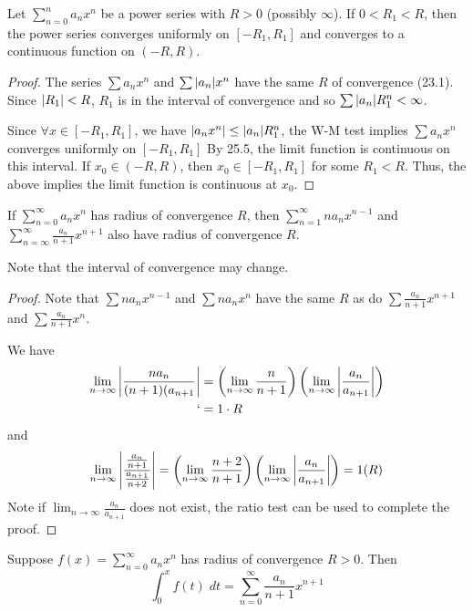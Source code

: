 \documentclass{article}
\begin{document}
    \begin{cthm}
      Let $\sum_{n=0}^n a_nx^n$ be a power series with $R > 0$ (possibly $\infty$). If $0 < R_1 < R$, then the power series converges uniformly on $[-R_1, R_1]$ and converges to a continuous function on $(-R, R)$.
    \end{cthm}
    \begin{proof}
      The series $\sum a_nx^n$ and $\sum \abs{a_n}x^n$ have the same $R$ of convergence (23.1). Since $\abs{R_1} < R$, $R_1$ is in the interval of convergence and so $\sum \abs{a_n}R_1^n < \infty$.

      Since $\forall x \in [-R_1, R_1]$, we have $\abs{a_nx^n} \leq \abs{a_n}R_1^n$, the W-M test implies $\sum a_nx^n$ converges uniformly on $[-R_1, R_1]$ By 25.5, the limit function is continuous on this interval. If $x_0 \in (-R, R)$, then $x_0 \in [-R_1, R_1]$ for some $R_1 < R$. Thus, the above implies the limit function is continuous at $x_0$.
    \end{proof}
    \begin{clemma}[Lemma 26.3]
      If $\sum_{n=0}^\infty a_nx^n$ has radius of convergence $R$, then $\sum_{n=1}^\infty na_nx^{n-1}$ and $\sum_{n=\infty}^\infty \frac{a_n}{n+1}x^{n+1}$ also have radius of convergence $R$.

      Note that the interval of convergence may change.
    \end{clemma}
    \begin{proof}
      Note that $\sum na_nx^{n-1}$ and $\sum na_nx^n$ have the same $R$ as do $\sum \frac{a_n}{n+1}x^{n+1}$ and $\sum \frac{a_n}{n+1} x^n$.

      We have
      \begin{align*}
        \lim_{n\to\infty} \abs{\frac{na_n}{(n+1)(a_{n+1}}} &= \left(\lim_{n\to\infty} \frac{n}{n+1}\right)\left(\lim_{n\to\infty} \abs{\frac{a_n}{a_{n+1}}}\right)\\
          `       &= 1 \cdot R\\
        \end{align*} and \[
          \lim_{n\to\infty} \abs{\frac{\frac{a_n}{n+1}}{\frac{a_{n+1}}{n+2}}} = \left(\lim_{n\to\infty} \frac{n+2}{n+1}\right)\left(\lim_{n\to\infty}\abs{\frac{a_n}{a_{n+1}}}\right) = 1(R)
        \]
        Note if $\lim_{n\to\infty} \frac{a_n}{a_{n+1}}$ does not exist, the ratio test can be used to complete the proof.
      \end{proof}
      \begin{cthm}[Theorem 26.4]
        Suppose $f(x) = \sum_{n=0}^\infty a_nx^n$ has radius of convergence $R > 0$. Then \[
          \int_0^x f(t) \; dt = \sum_{n=0}^\infty \frac{a_n}{n+1}x^{n+1}
        \]
      \end{cthm}
\end{document}
